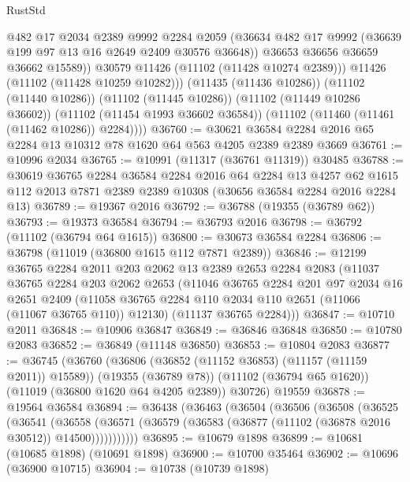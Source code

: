 \begin{lexlean}{RustStd}
\begin{coremodule}
                @482
                @17
                @2034
                @2389
                @9992
                @2284
                @2059
                (@36634 @482 @17 @9992 (@36639 @199 @97 @13 @16 @2649 @2409 @30576 @36648))
                @36653
                @36656
                @36659
                @36662
                @15589))
            @30579
            @11426
            (@11102 (@11428 @10274 @2389)))
          @11426
          (@11102 (@11428 @10259 @10282)))
        (@11435 (@11436 @10286))
        (@11102 (@11440 @10286))
        (@11102 (@11445 @10286))
        (@11102 (@11449 @10286 @36602))
        (@11102 (@11454 @1993 @36602 @36584))
        (@11102 (@11460 (@11461 (@11462 @10286)) @2284))))
@36760 := @30621 @36584 @2284 @2016 @65 @2284 @13 @10312 @78 @1620 @64 @563 @4205 @2389 @2389 @3669
@36761 := @10996 @2034
@36765 := @10991 (@11317 (@36761 @11319)) @30485
@36788 := @30619
    @36765
    @2284
    @36584
    @2284
    @2016
    @64
    @2284
    @13
    @4257
    @62
    @1615
    @112
    @2013
    @7871
    @2389
    @2389
    @10308
    (@30656 @36584 @2284 @2016 @2284 @13)
@36789 := @19367 @2016
@36792 := @36788 (@19355 (@36789 @62))
@36793 := @19373 @36584
@36794 := @36793 @2016
@36798 := @36792 (@11102 (@36794 @64 @1615))
@36800 := @30673 @36584 @2284
@36806 := @36798 (@11019 (@36800 @1615 @112 @7871 @2389))
@36846 := @12199
    @36765
    @2284
    @2011
    @203
    @2062
    @13
    @2389
    @2653
    @2284
    @2083
    (@11037
      @36765
      @2284
      @203
      @2062
      @2653
      (@11046
        @36765
        @2284
        @201
        @97
        @2034
        @16
        @2651
        @2409
        (@11058 @36765 @2284 @110 @2034 @110 @2651 (@11066 (@11067 @36765 @110)) @12130)
        (@11137 @36765 @2284)))
@36847 := @10710 @2011
@36848 := @10906 @36847
@36849 := @36846 @36848
@36850 := @10780 @2083
@36852 := @36849 (@11148 @36850)
@36853 := @10804 @2083
@36877 := @36745
    (@36760
      (@36806 (@36852 (@11152 @36853) (@11157 (@11159 @2011)) @15589))
      (@19355 (@36789 @78))
      (@11102 (@36794 @65 @1620))
      (@11019 (@36800 @1620 @64 @4205 @2389))
      @30726)
    @19559
@36878 := @19564 @36584
@36894 := @36438
    (@36463
      (@36504
        (@36506
          (@36508
            (@36525
              (@36541
                (@36558
                  (@36571 (@36579 (@36583 (@36877 (@11102 (@36878 @2016 @30512)) @14500)))))))))))
@36895 := @10679 @1898
@36899 := @10681 (@10685 @1898) (@10691 @1898)
@36900 := @10700 @35464
@36902 := @10696 (@36900 @10715)
@36904 := @10738 (@10739 @1898)

\end{coremodule}
\end{lexlean}
